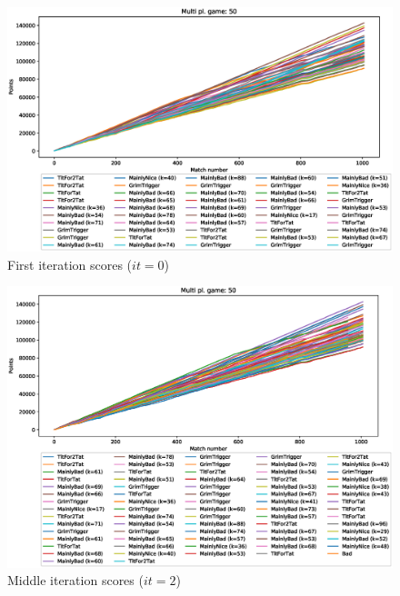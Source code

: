 \documentclass[journal,10pt,twoside]{IEEEtran}
\begin{document}
\begin{figure}[!ht]
    \centering
    \includegraphics[width=1\columnwidth]{../img/cipdmp-incr/alt1/cipdmp-scores-increasing-pop-50-r0}
    \caption{First iteration scores ($it=0$)}
    \label{fig:incrCFI}
\end{figure}

\begin{figure}[!ht]
    \centering
    \includegraphics[width=1\columnwidth]{../img/cipdmp-incr/alt1/cipdmp-scores-increasing-pop-50-r2}
    \caption{Middle iteration scores ($it=2$)}
    \label{fig:incrCMI}
\end{figure}
\end{document}
